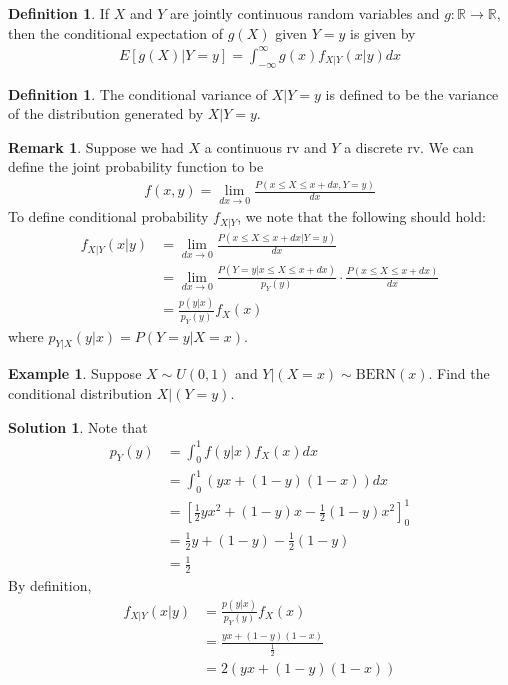 \documentclass[11pt]{amsart}
\theoremstyle{definition}
\newtheorem{definition}[theorem]{Definition}
\newtheorem{remark}[theorem]{Remark}
\newtheorem{example}[theorem]{Example}
\newtheorem{solution}[theorem]{Solution}
\numberwithin{equation}{section}
\begin{document}
 \begin{definition}
     If $X$ and $Y$ are jointly continuous random variables and $g:\mathbb R\to\mathbb R$, then the conditional expectation of $g(X)$ given $Y=y$ is given by
     \begin{align*}
         E[g(X)|Y=y]=\int_{-\infty}^\infty g(x)f_{X|Y}(x|y)dx
     \end{align*}
 \end{definition}
 \begin{definition}
     The conditional variance of $X|Y=y$ is defined to be the variance of the distribution generated by $X|Y=y$.
 \end{definition}
 \begin{remark}
     Suppose we had $X$ a continuous rv and $Y$ a discrete rv. We can define the joint probability function to be
     \begin{align*}
         f(x,y)=\lim_{dx\to0}\frac{P(x\le X\le x+dx,Y=y)}{dx}
     \end{align*}
     To define conditional probability $f_{X|Y}$, we note that the following should hold:
     \begin{align*}
         f_{X|Y}(x|y)&=\lim_{dx\to0}\frac{P(x\le X\le x+dx|Y=y)}{dx}\\
         &=\lim_{dx\to0}\frac{P(Y=y|x\le X\le x+dx)}{p_Y(y)}\cdot\frac{P(x\le X\le x+dx)}{dx}\\
         &=\frac{p(y|x)}{p_Y(y)}f_X(x)
     \end{align*}
     where $p_{Y|X}(y|x)=P(Y=y|X=x)$. 
 \end{remark}
 \begin{example}
     Suppose $X\sim U(0,1)$ and $Y|(X=x)\sim\mathrm{BERN}(x)$. Find the conditional distribution $X|(Y=y)$.
 \end{example}
 \addtocounter{theorem}{-1}
 \begin{solution}
     Note that 
     \begin{align*}
         p_Y(y)&=\int_{0}^1 f(y|x)f_X(x)dx\\
         &=\int_{0}^1 (yx+(1-y)(1-x))dx\\
         &=\left[\frac{1}{2}yx^2+(1-y)x-\frac{1}{2}(1-y)x^2\right]^{1}_{0}\\
         &=\frac{1}{2}y+(1-y)-\frac{1}{2}(1-y)\\
         &=\frac{1}{2}
     \end{align*}
     By definition,
     \begin{align*}
         f_{X|Y}(x|y)&=\frac{p(y|x)}{p_Y(y)}f_X(x)\\
         &=\frac{yx+(1-y)(1-x)}{\frac{1}{2}}\\
         &=2(yx+(1-y)(1-x))
     \end{align*}
 \end{solution}
\end{document}
